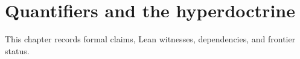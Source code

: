 \chapter{Quantifiers and the hyperdoctrine}\label{ch:hyperdoctrine}

\label{def:hyperdoctrine}

This chapter records formal claims, Lean witnesses, dependencies, and frontier status.





